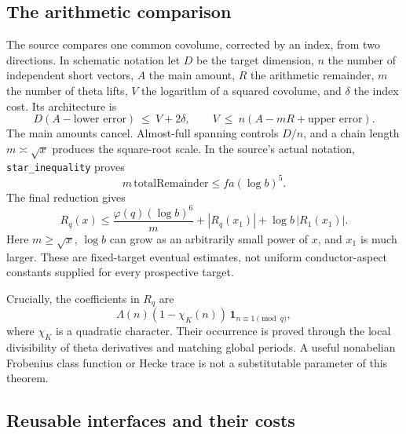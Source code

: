 \subsection{The arithmetic comparison}

The source compares one common covolume, corrected by an index, from two
directions. In schematic notation let $D$ be the target dimension, $n$ the
number of independent short vectors, $A$ the main amount, $R$ the arithmetic
remainder, $m$ the number of theta lifts, $V$ the logarithm of a squared
covolume, and $\delta$ the index cost. Its architecture is
\[
 D(A-\text{lower error})\ \le\ V+2\delta,
 \qquad
 V\ \le\ n(A-mR+\text{upper error}).
\]
The main amounts cancel. Almost-full spanning controls $D/n$, and a chain
length $m\asymp\sqrt{x}$ produces the square-root scale. In the source's
actual notation, \texttt{star\_inequality} proves
\begin{equation}\label{eq:star}
 m\,\mathrm{totalRemainder}\le f a(\log b)^5.
\end{equation}
The final reduction gives
\begin{equation}\label{eq:remainder}
 R_q(x)\le \frac{\varphi(q)(\log b)^6}{m}
       +|R_q(x_1)|+\log b\,|R_1(x_1)|.
\end{equation}
Here $m\ge\sqrt{x}$, $\log b$ can grow as an arbitrarily small power of $x$,
and $x_1$ is much larger. These are fixed-target eventual estimates, not
uniform conductor-aspect constants supplied for every prospective target.

Crucially, the coefficients in $R_q$ are
\[
 \Lambda(n)(1-\chi_K(n))\,\mathbf 1_{n\equiv1\pmod q},
\]
where $\chi_K$ is a quadratic character. Their occurrence is proved through
the local divisibility of theta derivatives and matching global periods.
A useful nonabelian Frobenius class function or Hecke trace is not a
substitutable parameter of this theorem.

\subsection{Reusable interfaces and their costs}

